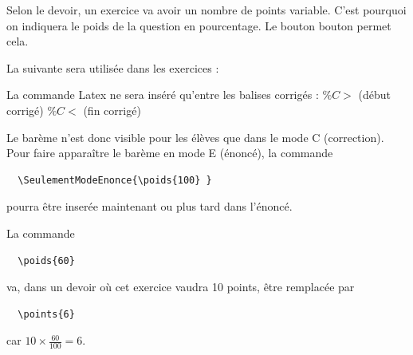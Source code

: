 \begin{dsxl}
 Selon le devoir, un exercice va avoir un nombre de points variable. C'est pourquoi on indiquera le poids de la question en pourcentage. 
Le bouton bouton   permet cela. 
\end{dsxl}

La  suivante sera utilisée dans les exercices : 
\begin{dsxl}
 La commande Latex   ne sera inséré qu'entre les balises corrigés :  $\%C>$ (début corrigé)  $\%C<$ (fin corrigé)
\end{dsxl}

Le barème n'est donc visible pour les élèves que dans le mode C (correction). Pour faire apparaître le barème en mode E (énoncé), la commande 
\begin{verbatim}
  \SeulementModeEnonce{\poids{100} }
\end{verbatim}
pourra être inserée maintenant ou plus tard dans l'énoncé.

\begin{dsxl}
 La commande 
 \begin{verbatim}
  \poids{60}
 \end{verbatim}
va, dans un devoir où cet exercice vaudra 10 points, être remplacée par 
 \begin{verbatim}
  \points{6}
 \end{verbatim}
 car $10\times \frac{60}{100} = 6$. 
\end{dsxl}

